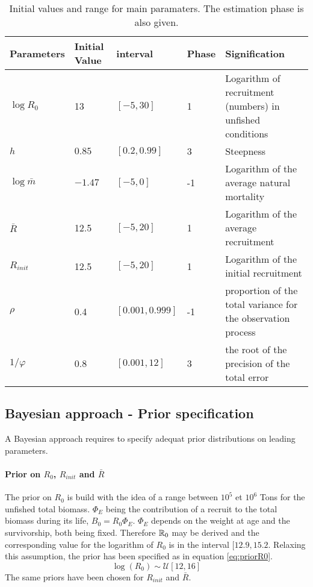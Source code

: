 \begin{table}[ht]
\centering
\begin{tabular}{p{2.1cm}p{2.1cm}p{2.2cm}p{2cm}p{6cm}}
  \hline
Parameters & Initial Value & interval & Phase & Signification  \\ \hline
 $\log{R_0}$ & 13  & $[-5,30]$ & 1 & Logarithm of recruitment (numbers) in unfished conditions\\
 $h$ & $0.85$ & $[0.2, 0.99]$ & 3 &  Steepness \\
$\log{\bar{m}}$ & $-1.47$ & $[-5,0]$ &-1 & Logarithm of the average natural mortality\\
$\bar{R}$& 12.5	& $[-5,	20]$ &	1	 & Logarithm of the average recruitment\\
$R_{init}$ & 12.5&	$[-5,	20]$ &	1	 & Logarithm of the initial recruitment\\
$\rho$ & 0.4	& $[0.001,0.999]$ & -1 & proportion of the total variance for the observation process \\
$1/\varphi$ & 0.8 &	$[0.001,	12]$ & 	3 & the root of the precision of the total error \\
\hline
\end{tabular}
\caption{Initial values and range for main paramaters. The estimation phase is also given.}
\label{table:initial}
\end{table}


\subsection{Bayesian approach - Prior specification}
A Bayesian approach requires to specify adequat prior distributions on leading parameters.
\paragraph{Prior on $R_0$, $R_{init}$ and $\bar{R}$}
The prior on $R_0$ is build with the idea of a range between $10^5$ et $10^6$ Tons for the unfished total biomass. $\Phi_E$ being the contribution of a recruit to the total biomass during its life, 
$B_0=R_0\Phi_E$. $\Phi_E$ depends on the weight at age and the survivorship, both being fixed. Therefore $\mathbb{R}_0$ may be derived and the corresponding value for the logarithm of $R_0$ is in the interval $[12.9, 15.2$. Relaxing this assumption, 
the prior has been specified as in equation \ref{eq:priorR0}.
\begin{equation}
\log(R_0) \sim \mathcal{U}[12, 16] 
\label{eq:priorR0}
\end{equation}
The same priors have been chosen for $R_{init}$ and $\bar{R}$. 



